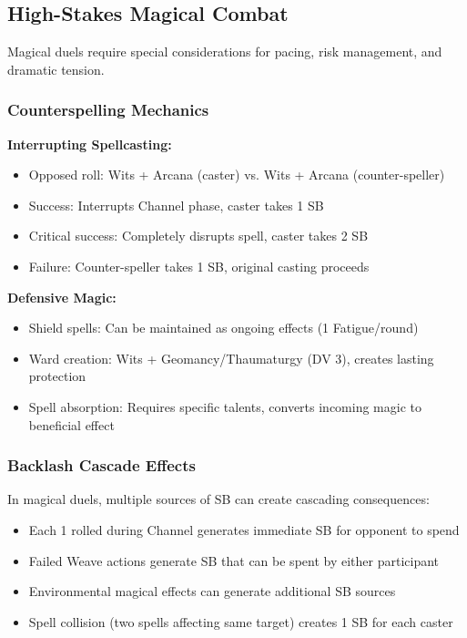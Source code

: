 \documentclass[11pt,letterpaper]{article}
\begin{document}
\subsection{High-Stakes Magical Combat}

Magical duels require special considerations for pacing, risk management, and dramatic tension.

\subsubsection{Counterspelling Mechanics}

\textbf{Interrupting Spellcasting:}
\begin{itemize}[leftmargin=*]
    \item Opposed roll: Wits + Arcana (caster) vs. Wits + Arcana (counter-speller)
    \item Success: Interrupts Channel phase, caster takes 1 SB
    \item Critical success: Completely disrupts spell, caster takes 2 SB
    \item Failure: Counter-speller takes 1 SB, original casting proceeds
\end{itemize}

\textbf{Defensive Magic:}
\begin{itemize}[leftmargin=*]
    \item Shield spells: Can be maintained as ongoing effects (1 Fatigue/round)
    \item Ward creation: Wits + Geomancy/Thaumaturgy (DV 3), creates lasting protection
    \item Spell absorption: Requires specific talents, converts incoming magic to beneficial effect
\end{itemize}

\subsubsection{Backlash Cascade Effects}

In magical duels, multiple sources of SB can create cascading consequences:
\begin{itemize}[leftmargin=*]
    \item Each 1 rolled during Channel generates immediate SB for opponent to spend
    \item Failed Weave actions generate SB that can be spent by either participant
    \item Environmental magical effects can generate additional SB sources
    \item Spell collision (two spells affecting same target) creates 1 SB for each caster
\end{itemize}
\end{document}
